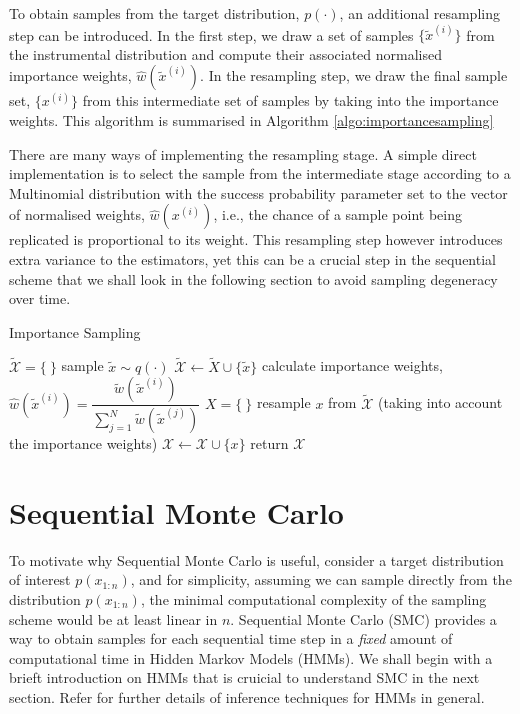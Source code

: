To obtain samples from the target distribution, $p(\cdot)$, an additional resampling step can be introduced. In the first step, we draw a set of samples $\{\tilde{x}^{(i)}\}$ from the instrumental distribution and compute their associated normalised importance weights, $\hat{w}(\tilde{x}^{(i)})$. In the resampling step, we draw the final sample set, $\{x^{(i)}\}$ from this intermediate set of samples by taking into the importance weights. This algorithm is summarised in Algorithm \ref{algo:importancesampling}

There are many ways of implementing the resampling stage. A simple direct implementation is to select the sample from the intermediate stage according to a Multinomial distribution with the success probability parameter set to the vector of normalised weights, $\hat{w}(x^{(i)})$, i.e., the chance of a sample point being replicated is proportional to its weight. This resampling step however introduces extra variance to the estimators, yet this can be a crucial step in the sequential scheme that we shall look in the following section to avoid sampling degeneracy over time.

\begin{algorithm}
\caption{Importance Sampling}\label{algo:importancesampling}
\begin{algorithmic}[1]
\State $\tilde{\mathcal{X}} = \{\ \}$
\Repeat
  \State sample $\tilde{x} \sim q(\cdot)$
  \State $\tilde{\mathcal{X}} \gets \tilde{X} \cup \{\tilde{x}\}$
\State calculate importance weights, $\hat{w}(\tilde{x}^{(i)})  = \dfrac{\tilde{w}(\tilde{x}^{(i)})}{\sum^N_{j=1} \tilde{w}(\tilde{x}^{(j)})}$
\State $X = \{\ \}$
\Repeat
  \State resample $x$ from $\tilde{\mathcal{X}}$ (taking into account the importance weights)
  \State $\mathcal{X} \gets \mathcal{X} \cup \{x\}$
\State return $\mathcal{X}$
\EndFunction
\end{algorithmic}
\end{algorithm}

\section{Sequential Monte Carlo}
\label{sec:SMC}
To motivate why Sequential Monte Carlo is useful, consider a target distribution of interest $p(x_{1:n})$, and for simplicity, assuming we can sample directly from the distribution $p(x_{1:n})$, the minimal computational complexity of the sampling scheme would be at least linear in $n$. Sequential Monte Carlo (SMC) provides a way to obtain samples for each sequential time step in a \emph{fixed} amount of computational time in Hidden Markov Models (HMMs). We shall begin with a brieft introduction on HMMs that is cruicial to understand SMC in the next section. Refer \cite{CO05} for further details of inference techniques for HMMs in general. 

